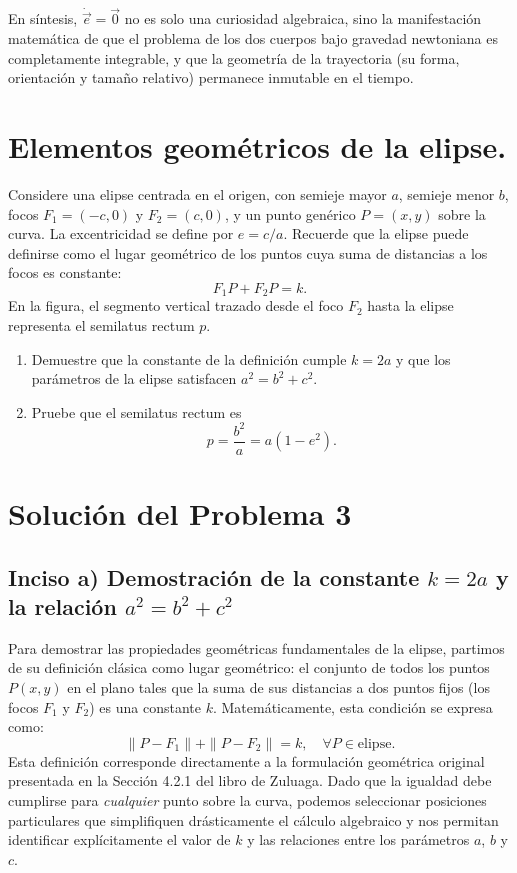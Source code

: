 \documentclass[12pt, a4paper]{article}
\begin{document}
En síntesis, $\dot{\vec{e}} = \vec{0}$ no es solo una curiosidad algebraica, sino la manifestación matemática de que el problema de los dos cuerpos bajo gravedad newtoniana es completamente integrable, y que la geometría de la trayectoria (su forma, orientación y tamaño relativo) permanece inmutable en el tiempo.




\section{Elementos geométricos de la elipse.} Considere una elipse centrada en el origen, con semieje mayor $a$, semieje menor $b$, focos $F_1 = (-c, 0)$ y $F_2 = (c, 0)$, y un punto genérico $P = (x, y)$ sobre la curva. La excentricidad se define por $e = c/a$. Recuerde que la elipse puede definirse como el lugar geométrico de los puntos cuya suma de distancias a los focos es constante:
$$F_1P + F_2P = k.$$
En la figura, el segmento vertical trazado desde el foco $F_2$ hasta la elipse representa el semilatus rectum $p$.
\begin{enumerate}
    \item[a)] Demuestre que la constante de la definición cumple $k = 2a$ y que los parámetros de la elipse satisfacen $a^2 = b^2 + c^2$.
    \item[b)] Pruebe que el semilatus rectum es
    $$p = \frac{b^2}{a} = a(1 - e^2).$$
\end{enumerate}


\section*{Solución del Problema 3}

\subsection*{Inciso a) Demostración de la constante $k = 2a$ y la relación $a^2 = b^2 + c^2$}

Para demostrar las propiedades geométricas fundamentales de la elipse, partimos de su definición clásica como lugar geométrico: el conjunto de todos los puntos $P(x,y)$ en el plano tales que la suma de sus distancias a dos puntos fijos (los focos $F_1$ y $F_2$) es una constante $k$. Matemáticamente, esta condición se expresa como:
$$
\|P - F_1\| + \|P - F_2\| = k, \quad \forall P \in \text{elipse}.
$$
Esta definición corresponde directamente a la formulación geométrica original presentada en la Sección 4.2.1 del libro de Zuluaga. Dado que la igualdad debe cumplirse para \textit{cualquier} punto sobre la curva, podemos seleccionar posiciones particulares que simplifiquen drásticamente el cálculo algebraico y nos permitan identificar explícitamente el valor de $k$ y las relaciones entre los parámetros $a$, $b$ y $c$.
\end{document}
